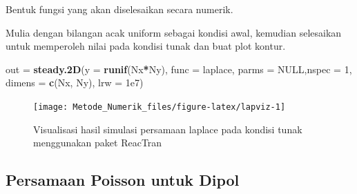\documentclass[]{book}
\newenvironment{Shaded}{\begin{snugshade}}{\end{snugshade}}
\newcommand{\ControlFlowTok}[1]{\textcolor[rgb]{0.13,0.29,0.53}{\textbf{#1}}}
\newcommand{\DataTypeTok}[1]{\textcolor[rgb]{0.13,0.29,0.53}{#1}}
\newcommand{\DecValTok}[1]{\textcolor[rgb]{0.00,0.00,0.81}{#1}}
\newcommand{\FloatTok}[1]{\textcolor[rgb]{0.00,0.00,0.81}{#1}}
\newcommand{\KeywordTok}[1]{\textcolor[rgb]{0.13,0.29,0.53}{\textbf{#1}}}
\newcommand{\NormalTok}[1]{#1}
\newcommand{\OperatorTok}[1]{\textcolor[rgb]{0.81,0.36,0.00}{\textbf{#1}}}
\newcommand{\OtherTok}[1]{\textcolor[rgb]{0.56,0.35,0.01}{#1}}
\newcommand{\StringTok}[1]{\textcolor[rgb]{0.31,0.60,0.02}{#1}}
\theoremstyle{definition}
\theoremstyle{definition}
\theoremstyle{definition}
\theoremstyle{remark}
\begin{document}
Bentuk fungsi yang akan diselesaikan secara numerik.

\begin{Shaded}
\end{Shaded}

Mulia dengan bilangan acak uniform sebagai kondisi awal, kemudian selesaikan untuk memperoleh nilai pada kondisi tunak dan buat plot kontur.

\begin{Shaded}
\begin{Highlighting}[]
\NormalTok{out =}\StringTok{ }\KeywordTok{steady.2D}\NormalTok{(}\DataTypeTok{y =} \KeywordTok{runif}\NormalTok{(Nx}\OperatorTok{*}\NormalTok{Ny), }\DataTypeTok{func =}\NormalTok{ laplace, }
                  \DataTypeTok{parms =} \OtherTok{NULL}\NormalTok{,}\DataTypeTok{nspec =} \DecValTok{1}\NormalTok{, }
                  \DataTypeTok{dimens =} \KeywordTok{c}\NormalTok{(Nx, Ny), }\DataTypeTok{lrw =} \FloatTok{1e7}\NormalTok{)}
\end{Highlighting}
\end{Shaded}

\begin{figure}

{\centering \texttt{[image: Metode\_Numerik\_files/figure-latex/lapviz-1]} 

}

\caption{Visualisasi hasil simulasi persamaan laplace pada kondisi tunak menggunakan paket ReacTran}\label{fig:lapviz}
\end{figure}

\hypertarget{persamaan-poisson-untuk-dipol}{%
\subsection{Persamaan Poisson untuk Dipol}\label{persamaan-poisson-untuk-dipol}}
\end{document}
